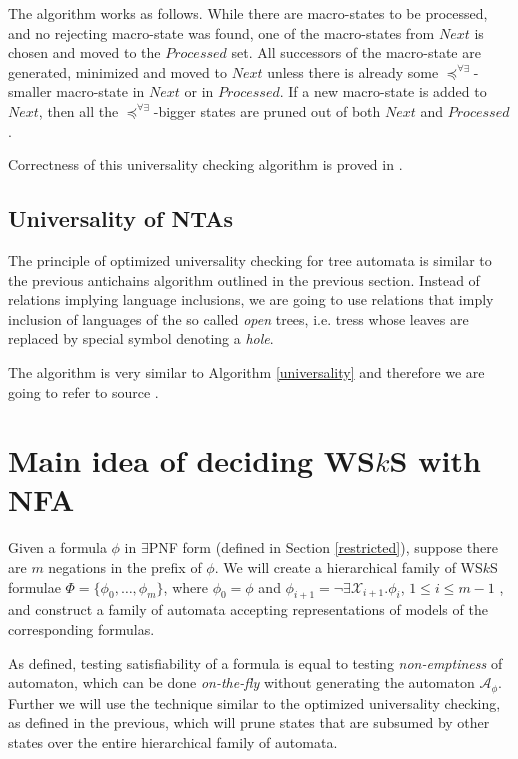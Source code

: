 	The algorithm works as follows. While there are macro-states to be processed, and no rejecting macro-state was found, one of the macro-states from $Next$ is chosen and moved to the $Processed$ set. All successors of the macro-state are generated, minimized and moved to $Next$ unless there is already some $\preceq^{\forall\exists}$-smaller macro-state in $Next$ or in $Processed$. If a new macro-state is added to $Next$, then all the $\preceq^{\forall\exists}$-bigger states are pruned out of both $Next$ and $Processed$. 
	
	Correctness of this universality checking algorithm is proved in \cite{tacas}.

\subsection{Universality of NTAs}

The principle of optimized universality checking for tree automata is similar to the previous antichains algorithm outlined in the previous section. Instead of relations implying language inclusions, we are going to use relations that imply inclusion of languages of the so called \emph{open} trees, i.e. tress whose leaves are replaced by special symbol denoting a \emph{hole}.

The algorithm is very similar to Algorithm \ref{universality} and therefore we are going to refer to source \cite{tacas}.

\section{Main idea of deciding WS$k$S with NFA}\label{our}

Given a formula $\phi$ in $\exists$PNF form (defined in Section \ref{restricted}), suppose there are $m$ negations in the prefix of $\phi$. We will create a hierarchical family of WS$k$S formulae $\Phi = \{\phi_0,\ldots,\phi_m\}$, where $\phi_0 = \phi$ and $\phi_{i+1} = \neg\exists\mathcal{X}_{i+1}.\phi_i$, $1 \leq i \leq m-1$ , and construct a family of automata accepting representations of models of the corresponding formulas.

As defined, testing satisfiability of a formula is equal to testing \emph{non-emptiness} of automaton, which can be done \emph{on-the-fly} without generating the automaton $\mathcal{A}_\phi$. Further we will use the technique similar to the optimized universality checking, as defined in the previous, which will prune states that are subsumed by other states over the entire hierarchical family of automata.

